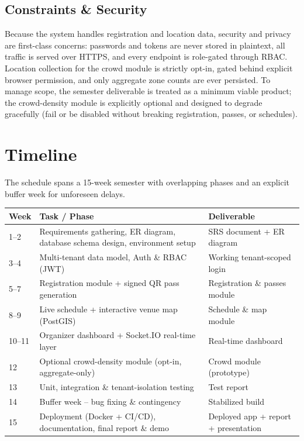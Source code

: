 \documentclass[11pt,a4paper]{article}
\begin{document}
\subsection{Constraints \& Security}
Because the system handles registration and location data, security and privacy are
first-class concerns: passwords and tokens are never stored in plaintext, all traffic
is served over HTTPS, and every endpoint is role-gated through RBAC. Location
collection for the crowd module is strictly opt-in, gated behind explicit browser
permission, and only aggregate zone counts are ever persisted. To manage scope, the
semester deliverable is treated as a minimum viable product; the crowd-density module
is explicitly optional and designed to degrade gracefully (fail or be disabled without
breaking registration, passes, or schedules).

\section{Timeline}

The schedule spans a 15-week semester with overlapping phases and an explicit buffer
week for unforeseen delays.

\begin{longtable}{@{}p{1.6cm}p{6.7cm}p{6.2cm}@{}}
\toprule
\textbf{Week} & \textbf{Task / Phase} & \textbf{Deliverable} \\
\midrule
\endhead
1--2 & Requirements gathering, ER diagram, database schema design, environment setup & SRS document + ER diagram \\
3--4 & Multi-tenant data model, Auth \& RBAC (JWT) & Working tenant-scoped login \\
5--7 & Registration module + signed QR pass generation & Registration \& passes module \\
8--9 & Live schedule + interactive venue map (PostGIS) & Schedule \& map module \\
10--11 & Organizer dashboard + Socket.IO real-time layer & Real-time dashboard \\
12 & Optional crowd-density module (opt-in, aggregate-only) & Crowd module (prototype) \\
13 & Unit, integration \& tenant-isolation testing & Test report \\
14 & Buffer week -- bug fixing \& contingency & Stabilized build \\
15 & Deployment (Docker + CI/CD), documentation, final report \& demo & Deployed app + report + presentation \\
\bottomrule
\end{longtable}
\end{document}
